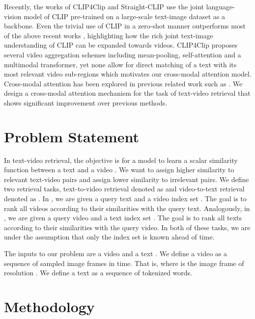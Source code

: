 \documentclass[10pt,twocolumn,letterpaper]{article}
\begin{document}
Recently, the works of CLIP4Clip \cite{luo2021clip4clip} and Straight-CLIP \cite{portillo2021straightforward} use the joint language-vision model of CLIP \cite{radford2021learning} pre-trained on a large-scale text-image dataset as a backbone. Even the trivial use of CLIP in a zero-shot manner outperforms most of the above recent works \cite{portillo2021straightforward}, highlighting how the rich joint text-image understanding of CLIP can be expanded towards videos. CLIP4Clip \cite{luo2021clip4clip} proposes several video aggregation schemes including mean-pooling, self-attention and a multimodal transformer, yet none allow for direct matching of a text with its most relevant video sub-regions which motivates our cross-modal attention model. Cross-modal attention has been explored in previous related work such as \cite{yao2015describing, li2019visualbert, lu2019vilbert, tan2019lxmert, chen2020uniter, li2020oscar, zhu2020actbert, lei2021less, miech2021thinking, zhang2021temporal, tan2021look, li2021align}. We design a cross-modal attention mechanism for the task of text-video retrieval that shows significant improvement over previous methods. 


\section{Problem Statement}
In text-video retrieval, the objective is for a model to learn a scalar similarity function  between a text  and a video . We want to assign higher similarity to relevant text-video pairs and assign lower similarity to irrelevant pairs.
We define two retrieval tasks, text-to-video retrieval denoted as  and video-to-text retrieval denoted as . In , we are given a query text  and a video index set . The goal is to rank all videos  according to their similarities with the query text.  Analogously, in , we are given a query video  and a text index set . The goal is to rank all texts  according to their similarities with the query video. In both of these tasks, we are under the assumption that only the index set is known ahead of time.

The inputs to our problem are a video  and a text . We define a video  as a sequence of  sampled image frames in time. That is,  where  is the  image frame of resolution . We define a text  as a sequence of tokenized words.



\section{Methodology}
\end{document}
